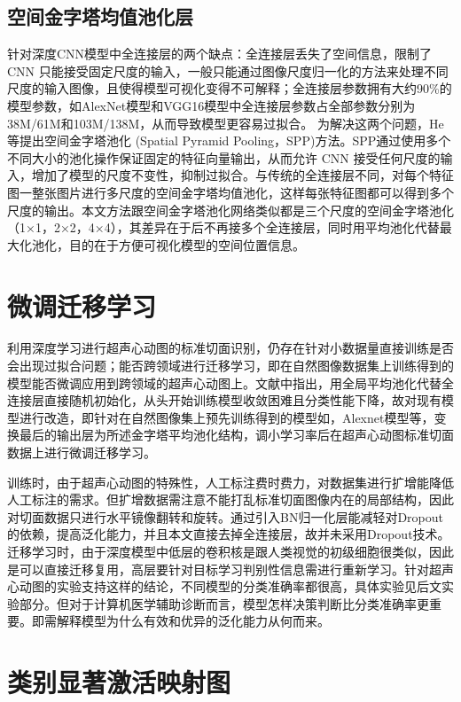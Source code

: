 \subsection{空间金字塔均值池化层}

针对深度CNN模型中全连接层的两个缺点：全连接层丢失了空间信息，限制了 CNN 只能接受固定尺度的输入，一般只能通过图像尺度归一化的方法来处理不同尺度的输入图像，且使得模型可视化变得不可解释；全连接层参数拥有大约90\%的模型参数，如AlexNet模型\citep{Krizhevsky2012}和VGG16模型\citep{Chatfield2014}中全连接层参数占全部参数分别为38M/61M和103M/138M，从而导致模型更容易过拟合\citep{Szegedy2015}。
为解决这两个问题，He等提出空间金字塔池化 (Spatial Pyramid Pooling，SPP)方法\citep{He2015spp}。SPP通过使用多个不同大小的池化操作保证固定的特征向量输出，从而允许 CNN 接受任何尺度的输入，增加了模型的尺度不变性，抑制过拟合。与传统的全连接层不同，对每个特征图一整张图片进行多尺度的空间金字塔均值池化，这样每张特征图都可以得到多个尺度的输出。本文方法跟空间金字塔池化网络类似都是三个尺度的空间金字塔池化（1×1，2×2，4×4），其差异在于后不再接多个全连接层，同时用平均池化代替最大化池化，目的在于方便可视化模型的空间位置信息。
\section{微调迁移学习}

利用深度学习进行超声心动图的标准切面识别，仍存在针对小数据量直接训练是否会出现过拟合问题；能否跨领域进行迁移学习，即在自然图像数据集上训练得到的模型能否微调应用到跨领域的超声心动图上。文献中指出，用全局平均池化代替全连接层直接随机初始化，从头开始训练模型收敛困难且分类性能下降，故对现有模型进行改造，即针对在自然图像集上预先训练得到的模型如，Alexnet模型等，变换最后的输出层为所述金字塔平均池化结构，调小学习率后在超声心动图标准切面数据上进行微调迁移学习。

训练时，由于超声心动图的特殊性，人工标注费时费力，对数据集进行扩增能降低人工标注的需求。但扩增数据需注意不能打乱标准切面图像内在的局部结构，因此对切面数据只进行水平镜像翻转和旋转。通过引入BN归一化层能减轻对Dropout的依赖，提高泛化能力，并且本文直接去掉全连接层，故并未采用Dropout技术。
迁移学习时，由于深度模型中低层的卷积核是跟人类视觉的初级细胞很类似，因此是可以直接迁移复用，高层要针对目标学习判别性信息需进行重新学习\citep{Zhou2015}。针对超声心动图的实验支持这样的结论，不同模型的分类准确率都很高，具体实验见后文实验部分。但对于计算机医学辅助诊断而言，模型怎样决策判断比分类准确率更重要。即需解释模型为什么有效和优异的泛化能力从何而来。
\section{类别显著激活映射图}

